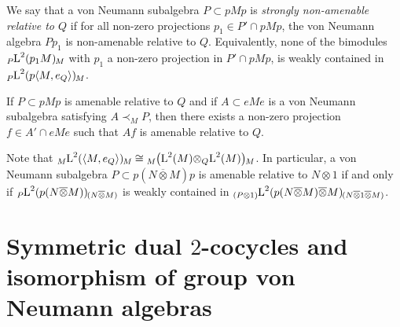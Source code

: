 \documentclass[a4paper,11pt]{amsart}
\numberwithin{equation}{section}
\begin{document}
We say that a von Neumann subalgebra $P \subset pMp$ is \emph{strongly non-amenable relative to $Q$} if for all non-zero projections $p_1 \in P' \cap pMp$, the von Neumann algebra $P p_1$ is non-amenable relative to $Q$. Equivalently, none of the bimodules ${\mathord{\raisebox{-0.4ex}[0ex][0ex]{\scriptsize ${P}$}{{{\mathord{\text{\rm L}}}^2(p_1 M)}}\hspace{-0.2ex}\raisebox{-0.4ex}[0ex][0ex]{\scriptsize ${M}$}}}$ with $p_1$ a non-zero projection in $P' \cap pMp$, is weakly contained in ${\mathord{\raisebox{-0.4ex}[0ex][0ex]{\scriptsize ${P}$}{{{\mathord{\text{\rm L}}}^2(p \langle M,e_Q \rangle)}}\hspace{-0.2ex}\raisebox{-0.4ex}[0ex][0ex]{\scriptsize ${M}$}}}$.

If $P \subset pMp$ is amenable relative to $Q$ and if $A \subset e M e$ is a von Neumann subalgebra satisfying $A {\prec}_M P$, then there exists a non-zero projection $f \in A' \cap eMe$ such that $Af$ is amenable relative to $Q$.

Note that ${\mathord{\raisebox{-0.4ex}[0ex][0ex]{\scriptsize ${M}$}{{{\mathord{\text{\rm L}}}^2(\langle M,e_Q \rangle)}}\hspace{-0.2ex}\raisebox{-0.4ex}[0ex][0ex]{\scriptsize ${M}$}}} \cong {\mathord{\raisebox{-0.4ex}[0ex][0ex]{\scriptsize ${M}$}{{\bigl({\mathord{\text{\rm L}}}^2(M) {\otimes}_Q {\mathord{\text{\rm L}}}^2(M)\bigr)}}\hspace{-0.2ex}\raisebox{-0.4ex}[0ex][0ex]{\scriptsize ${M}$}}}$. In particular, a von Neumann subalgebra $P \subset p (N {\mathbin{\overline{\otimes}}} M)p$ is amenable relative to $N {\otimes} 1$ if and only if ${\mathord{\raisebox{-0.4ex}[0ex][0ex]{\scriptsize ${P}$}{{{\mathord{\text{\rm L}}}^2(p (N {\mathbin{\overline{\otimes}}} M))}}\hspace{-0.2ex}\raisebox{-0.4ex}[0ex][0ex]{\scriptsize ${(N {\mathbin{\overline{\otimes}}} M)}$}}}$ is weakly contained in ${\mathord{\raisebox{-0.4ex}[0ex][0ex]{\scriptsize ${(P {\otimes} 1)}$}{{{\mathord{\text{\rm L}}}^2(p (N {\mathbin{\overline{\otimes}}} M) {\mathbin{\overline{\otimes}}} M)}}\hspace{-0.2ex}\raisebox{-0.4ex}[0ex][0ex]{\scriptsize ${(N {\mathbin{\overline{\otimes}}} 1 {\mathbin{\overline{\otimes}}} M)}$}}}$.

\section{Symmetric dual $2$-cocycles and isomorphism of group von Neumann algebras}\label{sec.intertwine-groups}
\end{document}
